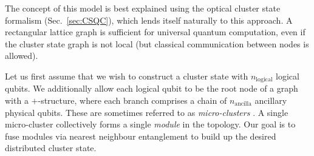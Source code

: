 The concept of this model is best explained using the optical cluster state formalism (Sec.~\ref{sec:CSQC}), which lends itself naturally to this approach. A rectangular lattice graph is sufficient for universal quantum computation, even if the cluster state graph is not local (but classical communication between nodes is allowed).

Let us first assume that we wish to construct a cluster state with $n_\mathrm{logical}$ logical qubits. We additionally allow each logical qubit to be the root node of a graph with a $+$-structure, where each branch comprises a chain of $n_\mathrm{ancilla}$ ancillary physical qubits. These are sometimes referred to as \textit{micro-clusters} \cite{bib:Nielsen04}. A single micro-cluster collectively forms a single \textit{module} in the topology. Our goal is to fuse modules via nearest neighbour entanglement to build up the desired distributed cluster state.

